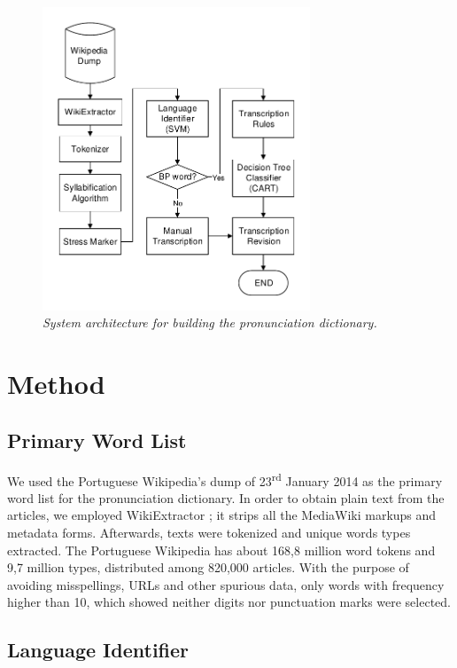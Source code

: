 \begin{figure}[t]
\centerline{ \includegraphics[width=8cm]{./gfx/aeiouado-flowchart-mod.pdf}}
\caption{{\it System architecture for building the pronunciation dictionary.}}
\label{g2p-architecture}
\end{figure}



\section{Method}

\subsection{Primary Word List}

We used the Portuguese Wikipedia's dump of 23\textsuperscript{rd} January 2014 as the primary word
list for the pronunciation dictionary. In order to obtain plain text from the articles, we employed WikiExtractor \cite{Wikiextractor2013};
it strips all the  MediaWiki markups and metadata forms. Afterwards, texts were tokenized and unique words types extracted. 
The Portuguese Wikipedia has about 168,8 million word tokens and 9,7 million types, distributed among  820,000 articles.
With the purpose of avoiding misspellings, URLs and other spurious data, only words with frequency higher than 10, 
which showed neither digits nor punctuation marks were selected. 

\subsection{Language Identifier}


